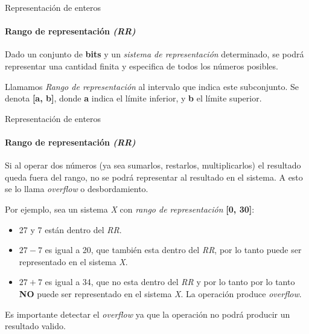 \documentclass[11pt,a4paper,spanish]{beamer}
\begin{document}
\begin{frame}{Representación de enteros}
    \framesubtitle{Rango de representación \emph{(RR)}}

    Dado un conjunto de \textbf{bits} y un \emph{sistema de representación}
    determinado, se podrá representar una cantidad finita y especifica de
    todos los números posibles.

    Llamamos \emph{Rango de representación} al intervalo que indica este
    subconjunto. Se denota \textbf{[a, b]}, donde \textbf{a} indica el límite
    inferior, y \textbf{b} el límite superior.

\end{frame}

\begin{frame}{Representación de enteros}
    \framesubtitle{Rango de representación \emph{(RR)}}

    Si al operar dos números (ya sea sumarlos, restarlos, multiplicarlos) el
    resultado queda fuera del rango, no se podrá representar al resultado en
    el sistema. A esto se lo llama \emph{overflow} o desbordamiento.

    \pause

    Por ejemplo, sea un sistema \emph{X} con \emph{rango de representación}
    \textbf{[0, 30]}:

    \begin{itemize}
        \item 27 y 7 están dentro del \emph{RR}.\pause
        \item \(27 - 7\) es igual a 20, que también esta dentro del \emph{RR},
            por lo tanto puede ser representado en el sistema \emph{X}.\pause
        \item \(27 + 7\) es igual a 34, que no esta dentro del \emph{RR} y por
            lo tanto por lo tanto \textbf{NO} puede ser representado en el
            sistema \emph{X}. La operación produce \emph{overflow}.\pause
    \end{itemize}

    Es importante detectar el \emph{overflow} ya que la operación no podrá
    producir un resultado valido.

\end{frame}
\end{document}
